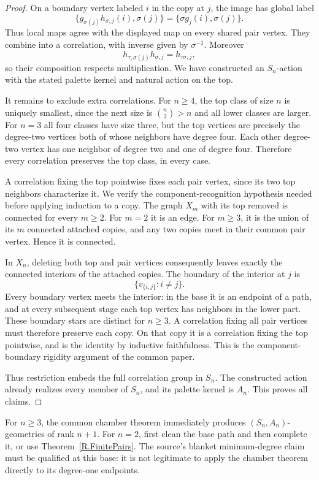 \begin{proof}
On a boundary vertex labeled $i$ in the copy at $j$, the image has global
label
\[
 \{g_{\sigma(j)}h_{\sigma,j}(i),\sigma(j)\}
   =\{\sigma g_j(i),\sigma(j)\}.
\]
Thus local maps agree with the displayed map on every shared pair vertex.
They combine into a correlation, with inverse given by $\sigma^{-1}$.
Moreover
\[
 h_{\tau,\sigma(j)}h_{\sigma,j}=h_{\tau\sigma,j},
\]
so their composition respects multiplication. We have constructed an
$S_n$-action with the stated palette kernel and natural action on the top.

It remains to exclude extra correlations. For $n\geq4$, the top class of
size $n$ is uniquely smallest, since the next size is $\binom n2>n$ and all
lower classes are larger. For $n=3$ all four classes have size three, but
the top vertices are precisely the degree-two vertices both of whose
neighbors have degree four. Each other degree-two vertex has one neighbor
of degree two and one of degree four. Therefore every correlation preserves
the top class, in every case.

A correlation fixing the top pointwise fixes each pair vertex, since its
two top neighbors characterize it. We verify the component-recognition
hypothesis needed before applying induction to a copy. The graph $X_m$
with its top removed is connected for every $m\geq2$. For $m=2$ it is an
edge. For $m\geq3$, it is the union of its $m$ connected attached copies,
and any two copies meet in their common pair vertex. Hence it is connected.

In $X_n$, deleting both top and pair vertices consequently leaves exactly
the connected interiors of the attached copies. The boundary of the interior
at $j$ is
\[
 \{v_{\{i,j\}}:i\ne j\}.
\]
Every boundary vertex meets the interior: in the base it is an endpoint of
a path, and at every subsequent stage each top vertex has neighbors in the
lower part. These boundary stars are distinct for $n\geq3$. A correlation
fixing all pair vertices must therefore preserve each copy. On that copy
it is a correlation fixing the top pointwise, and is the identity by
inductive faithfulness. This is the component-boundary rigidity argument
of the common paper.

Thus restriction embeds the full correlation group in $S_n$. The constructed
action already realizes every member of $S_n$, and its palette kernel is
$A_n$. This proves all claims.
\end{proof}

For $n\geq3$, the common chamber theorem immediately produces
$(S_n,A_n)$-geometries of rank $n+1$. For $n=2$, first clean the base path
and then complete it, or use Theorem~\ref{R.FinitePairs}. The source's
blanket minimum-degree claim must be qualified at this base: it is not
legitimate to apply the chamber theorem directly to its degree-one endpoints.
